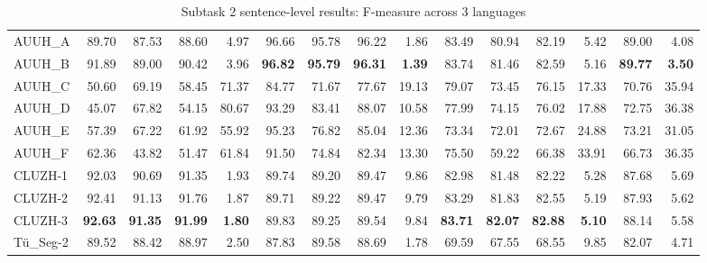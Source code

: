 \documentclass[11pt]{article}
\begin{document}
\begin{table*}[!h]
\begin{tabularx}{\textwidth}{l|RRRr|RRRr|RRRr|rr}
\hline
\hline
AUUH\_A                 & 89.70 & 87.53 & 88.60 & 4.97  & 96.66 & 95.78 & 96.22 & 1.86  & 83.49 & 80.94 & 82.19 & 5.42  & 89.00          & 4.08          \\
AUUH\_B                 & 91.89 & 89.00 & 90.42 & 3.96  & \textbf{96.82} & \textbf{95.79} & \textbf{96.31} & \textbf{1.39}  & 83.74 & 81.46 & 82.59 & 5.16  & \textbf{89.77}          & \textbf{3.50}          \\
AUUH\_C                 & 50.60 & 69.19 & 58.45 & 71.37 & 84.77 & 71.67 & 77.67 & 19.13 & 79.07 & 73.45 & 76.15 & 17.33 & 70.76          & 35.94         \\
AUUH\_D                 & 45.07 & 67.82 & 54.15 & 80.67 & 93.29 & 83.41 & 88.07 & 10.58 & 77.99 & 74.15 & 76.02 & 17.88 & 72.75          & 36.38         \\
AUUH\_E                 & 57.39 & 67.22 & 61.92 & 55.92 & 95.23 & 76.82 & 85.04 & 12.36 & 73.34 & 72.01 & 72.67 & 24.88 & 73.21          & 31.05         \\
AUUH\_F                 & 62.36 & 43.82 & 51.47 & 61.84 & 91.50 & 74.84 & 82.34 & 13.30 & 75.50 & 59.22 & 66.38 & 33.91 & 66.73          & 36.35         \\
\hline
\hline
CLUZH-1                 & 92.03 & 90.69 & 91.35 & 1.93  & 89.74 & 89.20 & 89.47 & 9.86  & 82.98 & 81.48 & 82.22 & 5.28  & 87.68          & 5.69          \\
CLUZH-2                 & 92.41 & 91.13 & 91.76 & 1.87  & 89.71 & 89.22 & 89.47 & 9.79  & 83.29 & 81.83 & 82.55 & 5.19  & 87.93          & 5.62          \\
CLUZH-3                 & \textbf{92.63} & \textbf{91.35} & \textbf{91.99} & \textbf{1.80}  & 89.83 & 89.25 & 89.54 & 9.84  & \textbf{83.71} & \textbf{82.07} & \textbf{82.88} & \textbf{5.10}  & 88.14          & 5.58          \\
\hline
\hline
Tü\_Seg-2                  & 89.52 & 88.42 & 88.97 & 2.50  & 87.83 & 89.58 & 88.69 & 1.78  & 69.59 & 67.55 & 68.55 & 9.85  & 82.07          & 4.71         
\end{tabularx}
\caption{\label{tab:subtask2:all}Subtask 2 sentence-level results: F-measure across 3 languages}
\end{table*}
\end{document}
